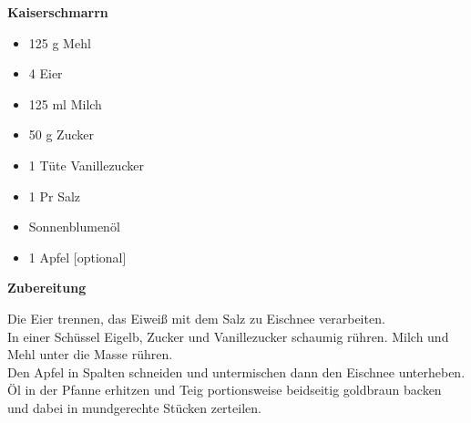 
\parindent0pt	

\pagestyle{empty}


\textbf{{\LARGE Kaiserschmarrn}}%


\hrulefill
\vspace*{\fill}
\begin{multicols}{2}	


\begin{itemize}
\item 125 g Mehl
\item 4 Eier
\item 125 ml Milch
\item 50 g Zucker
\item 1 Tüte Vanillezucker
\item 1 Pr Salz
\item Sonnenblumenöl
\item 1 Apfel [optional]
\end{itemize}

\end{multicols}
\vfill
\newpage
\textbf{{\LARGE Zubereitung}}%

\hrulefill

\vspace*{\fill}
\begin{multicols}{2}


Die Eier trennen, das Eiweiß mit dem Salz zu Eischnee verarbeiten.\\
In einer Schüssel Eigelb, Zucker und Vanillezucker schaumig rühren.
Milch und Mehl unter die Masse rühren.\\

Den Apfel in Spalten schneiden und untermischen dann den Eischnee unterheben.\\

Öl in der Pfanne erhitzen und Teig portionsweise beidseitig goldbraun backen und dabei
in mundgerechte Stücken zerteilen.




\end{multicols}
\vfill
